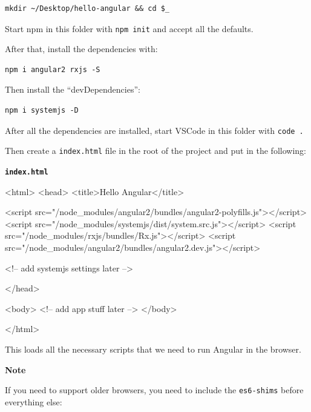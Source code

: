 \documentclass[12pt,]{article}
\newenvironment{Shaded}{}{}
\newcommand{\KeywordTok}[1]{\textcolor[rgb]{0.00,0.00,1.00}{{#1}}}
\newcommand{\StringTok}[1]{\textcolor[rgb]{0.00,0.50,0.50}{{#1}}}
\newcommand{\CommentTok}[1]{\textcolor[rgb]{0.00,0.50,0.00}{{#1}}}
\newcommand{\OtherTok}[1]{\textcolor[rgb]{1.00,0.25,0.00}{{#1}}}
\newcommand{\NormalTok}[1]{{#1}}
\begin{document}
\begin{verbatim}
mkdir ~/Desktop/hello-angular && cd $_
\end{verbatim}

Start npm in this folder with \texttt{npm\ init} and accept all the
defaults.

After that, install the dependencies with:

\begin{verbatim}
npm i angular2 rxjs -S
\end{verbatim}

Then install the ``devDependencies'':

\begin{verbatim}
npm i systemjs -D
\end{verbatim}

After all the dependencies are installed, start VSCode in this folder
with \texttt{code\ .}

Then create a \texttt{index.html} file in the root of the project and
put in the following:

\textbf{\texttt{index.html}}

\begin{Shaded}
\begin{Highlighting}[numbers=left,,]
\KeywordTok{<html>}
\KeywordTok{<head>}
  \KeywordTok{<title>}\NormalTok{Hello Angular}\KeywordTok{</title>}

  \KeywordTok{<script}\OtherTok{ src=}\StringTok{"/node_modules/angular2/bundles/angular2-polyfills.js"}\KeywordTok{></script>}
  \KeywordTok{<script}\OtherTok{ src=}\StringTok{"/node_modules/systemjs/dist/system.src.js"}\KeywordTok{></script>}
  \KeywordTok{<script}\OtherTok{ src=}\StringTok{"/node_modules/rxjs/bundles/Rx.js"}\KeywordTok{></script>}
  \KeywordTok{<script}\OtherTok{ src=}\StringTok{"/node_modules/angular2/bundles/angular2.dev.js"}\KeywordTok{></script>}

  \CommentTok{<!-- add systemjs settings later -->}

\KeywordTok{</head>}

\KeywordTok{<body>}
  \CommentTok{<!-- add app stuff later -->}
\KeywordTok{</body>}

\KeywordTok{</html>}
\end{Highlighting}
\end{Shaded}

This loads all the necessary scripts that we need to run Angular in the
browser.

\textbf{Note}

If you need to support older browsers, you need to include the
\texttt{es6-shims} before everything else:
\end{document}
